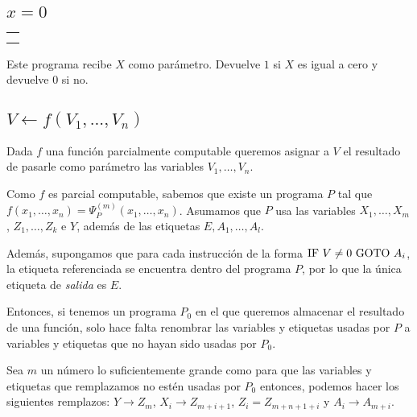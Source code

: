 \subsection{$x = 0$}
\begin{multicols}{2}
	\begin{center}
		\begin{tabular}{l}
			\sif{X}{E}\\
			\sincr{Y} \\
		\end{tabular}
	\end{center}

\columnbreak
Este programa recibe $X$ como parámetro. Devuelve $1$ si $X$ es igual a cero y devuelve $0$ si no.
\end{multicols}
\subsection{$V \leftarrow f(V_1,...,V_n)$}\label{appendix::otrasMAcros::asignacionFunc}

Dada $f$ una función parcialmente computable queremos asignar a $V$ el resultado de pasarle como parámetro las variables $V_1,\dots,V_n$.
	
Como $f$ es parcial computable, sabemos que existe un programa $P$ tal que $f(x_1,\dots,x_n) = \Psi_P^{(m)}(x_1,\dots,x_n)$. Asumamos que $P$ usa las variables $X_1,\dots, X_m$, $Z_1,\dots,Z_k$ e $Y$, además de las etiquetas $E, A_1,\dots,A_l$. 

Además, supongamos que para cada instrucción de la forma $\text{IF }V \neq 0 \text{ GOTO } A_i$, la etiqueta referenciada se encuentra dentro del programa $P$, por lo que la única etiqueta de \textit{salida} es $E$.

Entonces, si tenemos un programa $P_0$ en el que queremos almacenar el resultado de una función, solo hace falta renombrar las variables y etiquetas usadas por $P$ a variables y etiquetas que no hayan sido usadas por $P_0$. 

Sea $m$ un número lo suficientemente grande como para que las variables y etiquetas que remplazamos no estén usadas por $P_0$ entonces, podemos hacer los siguientes remplazos: $Y \to Z_m$, $X_i \to Z_{m + i + 1}$, $Z_i = Z_{m + n + 1 + i}$ y $A_i \to A_{m + i}$.

